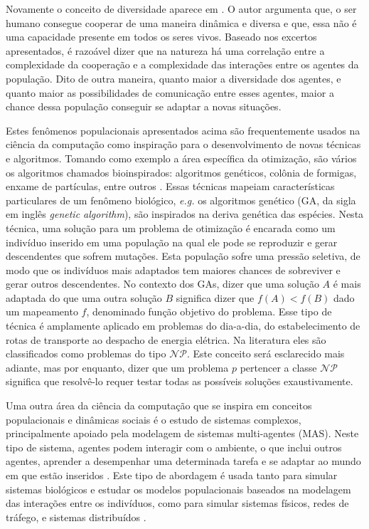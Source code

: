 Novamente o conceito de diversidade aparece em . O autor argumenta que, o ser humano consegue cooperar de uma maneira dinâmica e diversa e que, essa não é uma capacidade presente em todos os seres vivos. Baseado nos excertos apresentados, é razoável dizer que na natureza há uma correlação entre a complexidade da cooperação e a complexidade das interações entre os agentes da população. Dito de outra maneira, quanto maior a diversidade dos agentes, e quanto maior as possibilidades de comunicação entre esses agentes, maior a chance dessa população conseguir se adaptar a novas situações. 

Estes fenômenos populacionais apresentados acima são frequentemente usados na ciência da computação como inspiração para o desenvolvimento de novas técnicas e algoritmos. Tomando como exemplo a área específica da otimização, são vários os algoritmos chamados bioinspirados: algoritmos genéticos, colônia de formigas, enxame de partículas, entre outros \cite{binitha2012}. Essas técnicas mapeiam características particulares de um fenômeno biológico, \textit{e.g.} os algoritmos genético (GA, da sigla em inglês \textit{genetic algorithm}), são inspirados na deriva genética das espécies. Nesta técnica, uma solução para um problema de otimização é encarada como um indivíduo inserido em  uma população na qual ele pode se reproduzir e gerar descendentes que sofrem mutações. Esta população sofre uma pressão seletiva, de modo que os indivíduos mais adaptados tem maiores chances de sobreviver e gerar outros descendentes. No contexto dos GAs, dizer que uma solução $A$ é mais adaptada do que uma outra solução $B$ significa dizer que $f(A) < f(B)$ dado um mapeamento $f$, denominado função objetivo do problema. Esse tipo de técnica é amplamente aplicado em problemas do dia-a-dia, do estabelecimento de rotas de transporte ao despacho de energia elétrica. Na literatura eles são classificados como problemas do tipo $\mathcal{NP}$. Este conceito será esclarecido mais adiante, mas por enquanto, dizer que um problema $p$ pertencer a classe $\mathcal{NP}$ significa que resolvê-lo requer testar todas as possíveis soluções exaustivamente.

Uma outra área da ciência da computação que se inspira em conceitos populacionais e dinâmicas sociais é o estudo de sistemas complexos, principalmente apoiado pela modelagem de sistemas multi-agentes (MAS). Neste tipo de sistema, agentes podem interagir com o ambiente, o que inclui outros agentes, aprender a desempenhar uma determinada tarefa e se adaptar ao mundo em que estão inseridos \cite{holland2014}. Este tipo de abordagem é usada tanto para simular sistemas biológicos e estudar os modelos populacionais baseados na modelagem das interações entre os indivíduos, como para simular sistemas físicos, redes de tráfego, e sistemas distribuídos .

